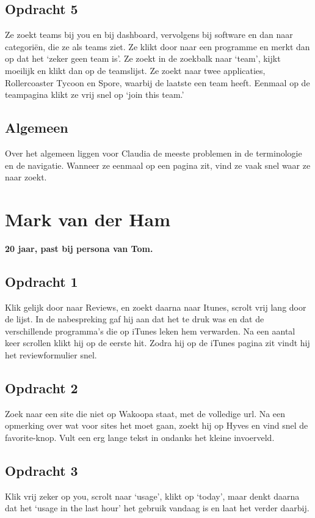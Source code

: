 \subsection{Opdracht 5}
 Ze zoekt teams bij you en bij dashboard, vervolgens bij software en dan naar categori\"en, die ze als teams ziet. Ze klikt door naar een programme en merkt dan op dat het `zeker geen team is'. Ze zoekt in de zoekbalk naar `team', kijkt moeilijk en klikt dan op de teamslijst. Ze zoekt naar twee applicaties, Rollercoaster Tycoon en Spore, waarbij de laatste een team heeft. Eenmaal op de teampagina klikt ze vrij snel op `join this team.'

 \subsection{Algemeen}
  Over het algemeen liggen voor Claudia de meeste problemen in de terminologie en de navigatie. Wanneer ze eenmaal op een pagina zit, vind ze vaak snel waar ze naar zoekt.

\section{Mark van der Ham}
\textbf{20 jaar, past bij persona van Tom.}

\subsection{Opdracht 1}
Klik gelijk door naar Reviews, en zoekt daarna naar Itunes, scrolt vrij lang door de lijst. In de nabespreking gaf hij aan dat het te druk was en dat de verschillende programma's die op iTunes leken hem verwarden. Na een aantal keer scrollen klikt hij op de eerste hit. Zodra hij op de iTunes pagina zit vindt hij het reviewformulier snel.

\subsection{Opdracht 2}
Zoek naar een site die niet op Wakoopa staat, met de volledige url. Na een opmerking over wat voor sites het moet gaan, zoekt hij op Hyves en vind snel de favorite-knop. Vult een erg lange tekst in ondanks het kleine invoerveld.

\subsection{Opdracht 3}
Klik vrij zeker op you, scrolt naar `usage', klikt op `today', maar denkt daarna dat het `usage in the last hour' het gebruik vandaag is en laat het verder daarbij.

